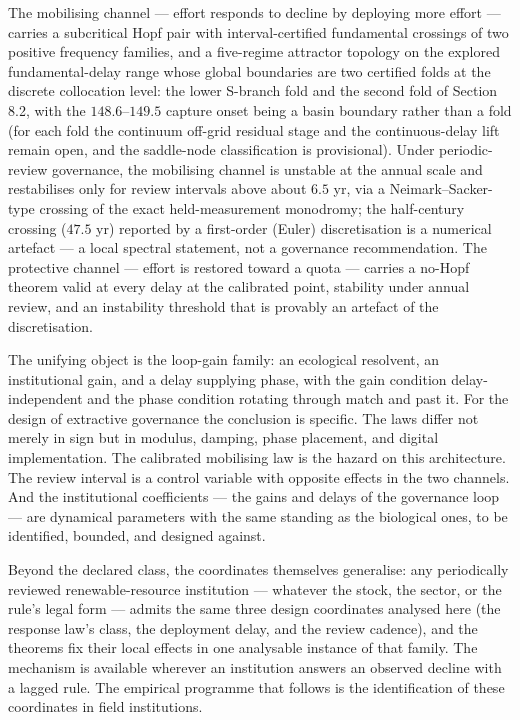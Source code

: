 \documentclass[11pt]{article}
\begin{document}
The mobilising channel --- effort responds to decline by deploying more
effort --- carries a subcritical Hopf pair with interval-certified
fundamental crossings of two positive frequency families, and a
five-regime attractor topology on the explored fundamental-delay range
whose global boundaries are two certified folds at the discrete
collocation level: the lower S-branch fold and the second fold of
Section 8.2, with the \(148.6\)--\(149.5\) capture onset being a basin
boundary rather than a fold (for each fold the continuum off-grid
residual stage and the continuous-delay lift remain open, and the
saddle-node classification is provisional). Under periodic-review
governance, the mobilising channel is unstable at the annual scale and
restabilises only for review intervals above about \(6.5\) yr, via a
Neimark--Sacker-type crossing of the exact held-measurement monodromy;
the half-century crossing (\(47.5\) yr) reported by a first-order
(Euler) discretisation is a numerical artefact --- a local spectral
statement, not a governance recommendation. The protective channel ---
effort is restored toward a quota --- carries a no-Hopf theorem valid at
every delay at the calibrated point, stability under annual review, and
an instability threshold that is provably an artefact of the
discretisation.

The unifying object is the loop-gain family: an ecological resolvent, an
institutional gain, and a delay supplying phase, with the gain condition
delay-independent and the phase condition rotating through match and
past it. For the design of extractive governance the conclusion is
specific. The laws differ not merely in sign but in modulus, damping,
phase placement, and digital implementation. The calibrated mobilising
law is the hazard on this architecture. The review interval is a control
variable with opposite effects in the two channels. And the
institutional coefficients --- the gains and delays of the governance
loop --- are dynamical parameters with the same standing as the
biological ones, to be identified, bounded, and designed against.

Beyond the declared class, the coordinates themselves generalise: any
periodically reviewed renewable-resource institution --- whatever the
stock, the sector, or the rule's legal form --- admits the same three
design coordinates analysed here (the response law's class, the
deployment delay, and the review cadence), and the theorems fix their
local effects in one analysable instance of that family. The mechanism
is available wherever an institution answers an observed decline with a
lagged rule. The empirical programme that follows is the identification
of these coordinates in field institutions.
\end{document}

